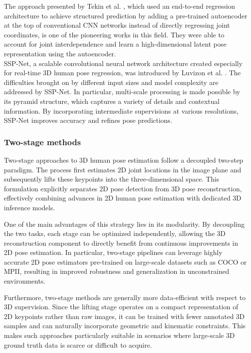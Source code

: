 The approach presented by Tekin et al. \cite{tekin2016structured}, which used an end-to-end regression architecture to achieve structured prediction by adding a pre-trained autoencoder at the top of conventional CNN networks instead 
of directly regressing joint coordinates, is one of the pioneering works in this field. They were able to account for joint interdependence and learn a high-dimensional latent pose representation using the autoencoder.\\
SSP-Net, a scalable convolutional neural network architecture created especially for real-time 3D human pose regression, was introduced by Luvizon et al. \cite{luvizon2023ssp}. The difficulties brought on by different input sizes and 
model complexity are addressed by SSP-Net. In particular, multi-scale processing is made possible by its pyramid structure, which captures a variety of details and contextual information. By incorporating intermediate supervisions at 
various resolutions, SSP-Net improves accuracy and refines pose predictions.


\subsubsection{Two-stage methods}
Two-stage approaches to 3D human pose estimation follow a decoupled two-step paradigm. The process first estimates 2D joint locations in the image plane and subsequently lifts these keypoints into the three-dimensional space. This 
formulation explicitly separates 2D pose detection from 3D pose reconstruction, effectively combining advances in 2D human pose estimation with dedicated 3D inference models.

One of the main advantages of this strategy lies in its modularity. By decoupling the two tasks, each stage can be optimized independently, allowing the 3D reconstruction component to directly benefit from continuous improvements in 
2D pose estimation. In particular, two-stage pipelines can leverage highly accurate 2D pose estimators pre-trained on large-scale datasets such as COCO or MPII, resulting in improved robustness and generalization in unconstrained 
environments.

Furthermore, two-stage methods are generally more data-efficient with respect to 3D supervision. Since the lifting stage operates on a compact representation of 2D keypoints rather than raw images, it can be trained with fewer 
annotated 3D samples and can naturally incorporate geometric and kinematic constraints. This makes such approaches particularly suitable in scenarios where large-scale 3D ground truth data is scarce or difficult to acquire.

